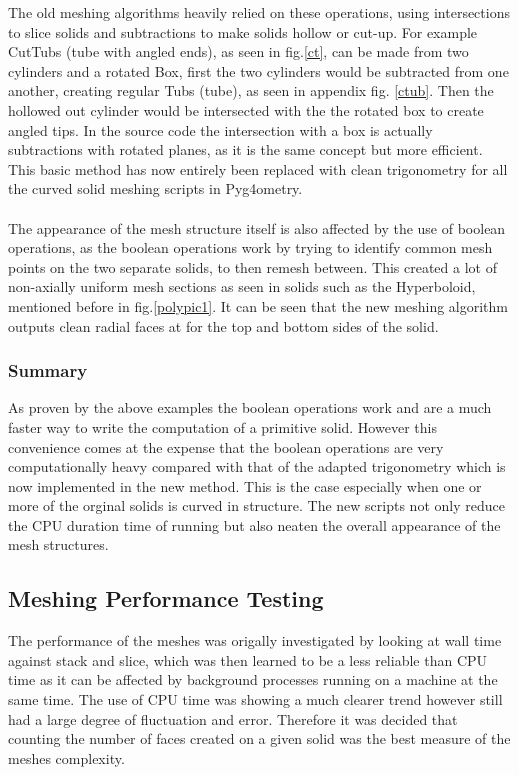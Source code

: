 \documentclass[12pt,a4paper]{article}
\begin{document}
\noindent The old meshing algorithms heavily relied on these operations, using intersections to slice solids and subtractions to make solids hollow or cut-up. For example CutTubs (tube with angled ends), as seen in fig.\ref{ct}, can be made from two cylinders and a rotated Box, first the two cylinders would be subtracted from one another, creating regular Tubs (tube), as seen in appendix fig. \ref{ctub}. Then the hollowed out cylinder would be intersected with the the rotated box to create angled tips. In the source code the intersection with a box is actually subtractions with rotated planes, as it is the same concept but more efficient. This basic method has now entirely been replaced with clean trigonometry for all the curved solid meshing scripts in Pyg4ometry.
\\\\
The appearance of the mesh structure itself is also affected by the use of boolean operations, as the boolean operations work by trying to identify common mesh points on the two separate solids, to then remesh between. This created a lot of non-axially uniform mesh sections as seen in solids such as the Hyperboloid, mentioned before in fig.\ref{polypic1}. It can be seen that the new meshing algorithm outputs clean radial faces at for the top and bottom sides of the solid.

\subsubsection{Summary}
As proven by the above examples the boolean operations work and are a much faster way to write the computation of a primitive solid. However this convenience comes at the expense that the boolean operations are very computationally heavy compared with that of the adapted trigonometry which is now implemented in the new method. This is the case especially when one or more of the orginal solids is curved in structure. The new scripts not only reduce the CPU duration time of running but also neaten the overall appearance of the mesh structures.

\subsection{Meshing Performance Testing}
The performance of the meshes was origally investigated by looking at wall time against stack and slice, which was then learned to be a less reliable than CPU time as it can be affected by background processes running on a machine at the same time. The use of CPU time was showing a much clearer trend however still had a large degree of fluctuation and error. Therefore it was decided that counting the number of faces created on a given solid was the best measure of the meshes complexity.
\end{document}
